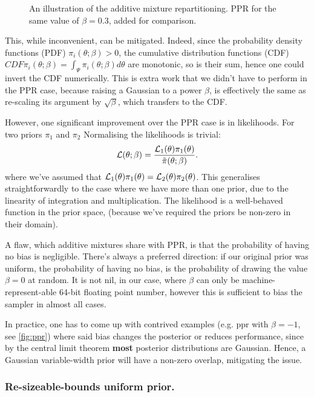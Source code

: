 \documentclass[usenatbib]{mnras}
\begin{document}
\begin{figure}
  
\caption{\label{orge46443d}
An illustration of the additive mixture repartitioning. PPR for the same value of \(\beta=0.3\), added for comparison.}
\end{figure}

This, while inconvenient, can be mitigated. Indeed, since the
probability density functions (PDF) \(\pi_{i}(\theta; \beta) >0\),
the cumulative distribution functions (CDF)
\(CDF{\pi}_{i}(\theta;\beta) = \int_{\Psi} \pi_{i}(\theta; \beta)
	d\theta\) are monotonic, so is their sum, hence one could invert
the CDF numerically. This is extra work that we didn't have to
perform in the PPR case, because raising a Gaussian to a power
\(\beta\), is effectively the same as re-scaling its argument by
\(\sqrt{\beta}\), which transfers to the CDF.

However, one significant improvement over the PPR case is in
likelihoods. For two priors \(\pi_{1}\) and \(\pi_{2}\) Normalising
the likelihoods is trivial:
\begin{equation}
{\cal L}(\theta; \beta) = \frac{{\cal L}_{1}(\theta) \pi_{1}(\theta)}{\tilde{\pi}(\theta; \beta)}.
\end{equation}
where we've assumed that \({\cal L}_{1}(\theta)\pi_{1}(\theta) =
	{\cal L}_{2}(\theta) \pi_{2}(\theta)\). This generalises
straightforwardly to the case where we have more than one prior,
due to the linearity of integration and multiplication. The
likelihood is a well-behaved function in the prior space, (because
we've required the priors be non-zero in their domain).

A flaw, which additive mixtures share with PPR, is that the
probability of having no bias is negligible. There's always a
preferred direction: if our original prior was uniform, the
probability of having no bias, is the probability of drawing the
value \(\beta=0\) at random. It is not nil, in our case, where
\(\beta\) can only be machine-represent-able 64-bit floating point
number, however this is sufficient to bias the sampler in almost
all cases.

In practice, one has to come up with contrived examples (e.g. ppr
with \(\beta=-1\), see \autoref{fig:ppr}) where said bias changes the
posterior or reduces performance, since by the central limit
theorem \textbf{most} posterior distributions are Gaussian. Hence, a
Gaussian variable-width prior will have a non-zero overlap,
mitigating the issue.

\subsubsection{Re-sizeable-bounds uniform prior.}
\label{sec:org4c0294d}
\end{document}
